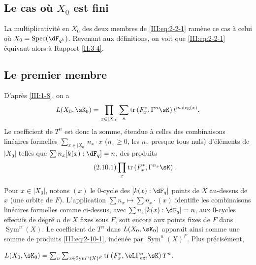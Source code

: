 \subsection{Le cas où $X_0$ est fini}\label{III:2-9}

La multiplicativité en $X_0$ des deux membres de \eqref{III:eq:2-2-1} 
ramène ce cas à celui où $X_0=\spec(\dF_{q^k})$. Revenant aux 
définitions, on voit que \eqref{III:eq:2-2-1} équivaut alors à 
Rapport \ref{II:3-4}. 





\subsection{Le premier membre}\label{III:2-10}

D'après \ref{III:1-8}, on a 
\[
  L(X_0,\sK_0) = \prod_{x\in |X_0|} \sum_n \tr\left(F_x^*,\Gamma^n\sK\right) t^{m\deg(x)} \text{.}
\]
Le coefficient de $T^n$ est donc la somme, étendue à celles des 
combinaisons linéaires formelles $\sum_{x\in |X_0|} n_x\cdot x$ 
($n_x\geqslant 0$, les $n_x$ presque tous nuls) d'éléments de $|X_0|$ 
telles que $\sum n_x [k(x):\dF_q] = n$, des produits 
\begin{equation*}\tag{2.10.1}\label{III:eq:2-10-1}
  \prod_x \tr\left(F_x^*,\Gamma^{n_x} \sK\right) \text{.}
\end{equation*}

Pour $x\in |X_0|$, notons $(x)$ le $0$-cycle des $[k(x):\dF_q]$ points de $X$ 
au-dessus de $x$ (une orbite de $F$). L'application 
$\sum n_x\mapsto \sum n_x\cdot (x)$ identifie les combinaisons linéaires 
formelles comme ci-dessus, avec $\sum n_x [k(x):\dF_q]=n$, aux $0$-cycles 
effectifs de degré $n$ de $X$ fixes sous $F$, soit encore aux points fixes de 
$F$ dans $\operatorname{Sym}^n(X)$. Le coefficient de $T^n$ dans $L(X_0,\sK_0)$ 
apparait ainsi comme une somme de produits \eqref{III:eq:2-10-1}, indenée 
par $\operatorname{Sym}^n(X)^F$. Plus précisément, 





\begin{lemma_}\label{III:2-11}
 $L(X_0,\sK_0) = \sum_n \sum_{x\in\operatorname{Sym}^n(X)^F} \tr\left(F_x^*,\eL\Gamma_\textnormal{ext}^n \sK\right) T^n$.
\end{lemma_}

